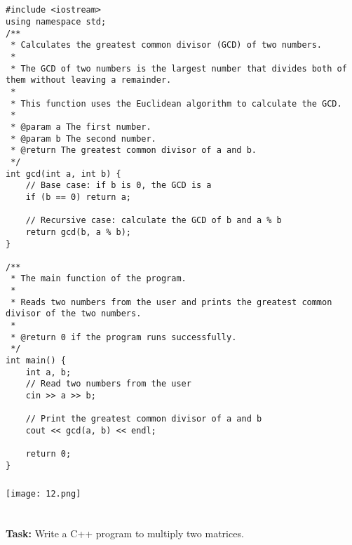 \documentclass[12pt,a4paper]{article}
\begin{document}
\subsection{}
\begin{lstlisting}
#include <iostream>
using namespace std;
/**
 * Calculates the greatest common divisor (GCD) of two numbers.
 *
 * The GCD of two numbers is the largest number that divides both of them without leaving a remainder.
 *
 * This function uses the Euclidean algorithm to calculate the GCD.
 *
 * @param a The first number.
 * @param b The second number.
 * @return The greatest common divisor of a and b.
 */
int gcd(int a, int b) {
    // Base case: if b is 0, the GCD is a
    if (b == 0) return a;

    // Recursive case: calculate the GCD of b and a % b
    return gcd(b, a % b);
}

/**
 * The main function of the program.
 *
 * Reads two numbers from the user and prints the greatest common divisor of the two numbers.
 *
 * @return 0 if the program runs successfully.
 */
int main() {
    int a, b;
    // Read two numbers from the user
    cin >> a >> b;

    // Print the greatest common divisor of a and b
    cout << gcd(a, b) << endl;

    return 0;
}

\end{lstlisting}

\subsubsection{}
\begin{center}
    \texttt{[image: 12.png]}
\end{center}


\section{}
\textbf{Task:} Write a C++ program to multiply two matrices.
\end{document}

